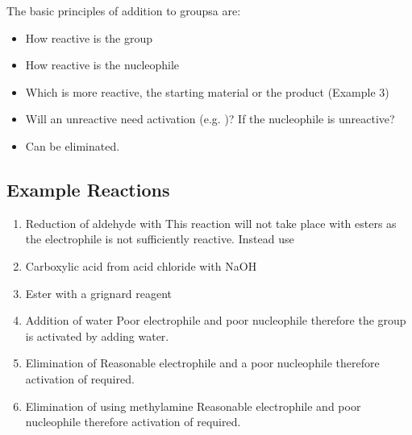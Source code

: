 \pagebreak

The basic principles of addition to  groupsa are:
\begin{itemize}
  \item How reactive is the  group
  \item How reactive is the nucleophile
  \item Which is more reactive, the starting material or the product (Example 3)
  \item Will an unreactive  need activation (e.g. )? If the
    nucleophile is unreactive?
  \item Can  be eliminated.
\end{itemize}

\subsection{Example Reactions}

\begin{enumerate}

  \item Reduction of aldehyde with 
    This reaction will not take place with esters as the electrophile is not
    sufficiently reactive. Instead use \\

  \item Carboxylic acid from acid chloride with NaOH

  \item Ester with a grignard reagent

  \item Addition of water
    Poor electrophile and poor nucleophile therefore the
     group is activated by adding water.

  \item Elimination of 
    Reasonable electrophile and a poor nucleophile therefore activation of
     required.

  \item Elimination of  using methylamine
    Reasonable electrophile and poor nucleophile therefore activation of
     required.
\end{enumerate}